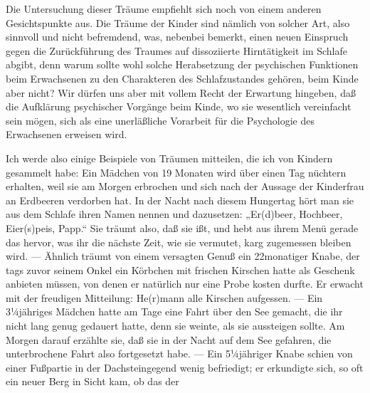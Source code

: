 \documentclass[twoside=true,titlepage=false,open=any, parskip=never, fontsize=10pt, headings=small, chapterprefix=false, appendixprefix=false]{scrbook}
\begin{document}
         
            
            
            
        \pstart
        Die Untersuchung dieser Träume empfiehlt sich noch von einem anderen
               Gesichtspunkte aus. Die Träume der Kinder sind nämlich von solcher Art, also sinnvoll und nicht befremdend, was,
               nebenbei bemerkt, einen neuen Einspruch gegen die Zurückführung des
               Traumes auf dissoziierte Hirntätigkeit im Schlafe abgibt, denn warum sollte wohl
               solche Herabsetzung der psychischen Funktionen beim Erwachsenen zu
               den Charakteren des Schlafzustandes gehören, beim Kinde aber nicht? Wir dürfen
               uns aber mit vollem Recht der Erwartung hingeben, daß die Aufklärung psychischer Vorgänge beim Kinde, wo sie wesentlich vereinfacht sein mögen, sich als eine unerläßliche Vorarbeit für die Psychologie
               des Erwachsenen erweisen wird.
        \pend
    
            
        \pstart
        Ich werde also einige Beispiele von Träumen mitteilen, die ich von Kindern
               gesammelt habe: Ein Mädchen von 19 Monaten wird über einen Tag nüchtern
               erhalten, weil sie am Morgen erbrochen und sich nach der Aussage der Kinderfrau
               an Erdbeeren verdorben hat. In der Nacht nach diesem Hungertag
               hört man sie aus dem Schlafe ihren Namen nennen und dazusetzen: „Er(d)beer, Hochbeer, Eier(s)peis, Papp.“  Sie träumt also,
               daß sie ißt, und hebt aus ihrem Menü gerade das hervor, was ihr die nächste
               Zeit, wie sie vermutet, karg zugemessen bleiben wird. — Ähnlich träumt von einem
               versagten Genuß ein 22monatiger Knabe, der tags zuvor seinem Onkel
               ein Körbchen mit frischen Kirschen hatte als Geschenk anbieten müssen, von
               denen er natürlich nur eine Probe kosten durfte. Er erwacht mit der
               freudigen Mitteilung: He(r)mann alle Kirschen aufgessen.
               — Ein 3¼jähriges Mädchen hatte am Tage eine Fahrt über den See gemacht, die
               ihr nicht lang genug gedauert hatte, denn sie weinte, als sie aussteigen sollte.
               Am Morgen darauf erzählte sie, daß sie in der Nacht auf dem See gefahren, die
               unterbrochene Fahrt also fortgesetzt habe. — Ein 5¼jähriger Knabe schien
               von einer Fußpartie in der Dachsteingegend wenig befriedigt; er erkundigte
               sich, so oft ein neuer Berg in Sicht kam, ob das der
        \pend
    
\end{document}
